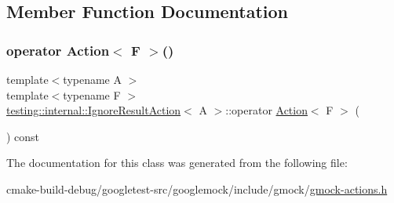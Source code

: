\subsection{Member Function Documentation}
\mbox{\label{classtesting_1_1internal_1_1IgnoreResultAction_affb8b7439604c860e1416f45339c6e37}} 
\subsubsection{\texorpdfstring{operator Action$<$ F $>$()}{operator Action< F >()}}
{\footnotesize\ttfamily template$<$typename A $>$ \\
template$<$typename F $>$ \\
\mbox{\hyperlink{classtesting_1_1internal_1_1IgnoreResultAction}{testing\+::internal\+::\+Ignore\+Result\+Action}}$<$ A $>$\+::operator \mbox{\hyperlink{classtesting_1_1Action}{Action}}$<$ F $>$ (\begin{DoxyParamCaption}{ }\end{DoxyParamCaption}) const\hspace{0.3cm}{\ttfamily [inline]}}



The documentation for this class was generated from the following file\+:\begin{DoxyCompactItemize}
\item 
cmake-\/build-\/debug/googletest-\/src/googlemock/include/gmock/\mbox{\hyperlink{gmock-actions_8h}{gmock-\/actions.\+h}}\end{DoxyCompactItemize}
